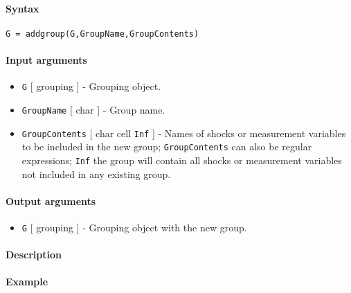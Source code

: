 


	\paragraph{Syntax}

\begin{verbatim}
G = addgroup(G,GroupName,GroupContents)
\end{verbatim}

\paragraph{Input arguments}

\begin{itemize}
\item
  \texttt{G} {[} grouping {]} - Grouping object.
\item
  \texttt{GroupName} {[} char {]} - Group name.
\item
  \texttt{GroupContents} {[} char \textbar{} cell \textbar{}
  \texttt{Inf} {]} - Names of shocks or measurement variables to be
  included in the new group; \texttt{GroupContents} can also be regular
  expressions; \texttt{Inf} the group will contain all shocks or
  measurement variables not included in any existing group.
\end{itemize}

\paragraph{Output arguments}

\begin{itemize}
\itemsep1pt\parskip0pt
\item
  \texttt{G} {[} grouping {]} - Grouping object with the new group.
\end{itemize}

\paragraph{Description}

\paragraph{Example}


